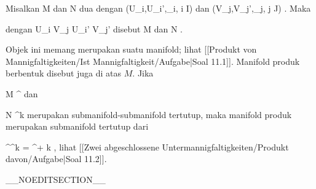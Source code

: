 \setcounter{section}{11}


{}
{

Misalkan
\mathkor {} {M} {dan} {N} {}
dua
dengan
\mathkor {} {(U_i,U_i',\alpha_i, i \in I)} {dan} {(V_j,V_j',\beta_j, j \in J)} {.}
Maka

 dengan
 {U_i \times V_j } { U_i' \times V_j'
} {}
 {} {}
disebut 
\mathkor {} {M} {dan} {N} {.}

}

Objek ini memang merupakan suatu manifold; lihat
[[Produkt von Mannigfaltigkeiten/Ist Mannigfaltigkeit/Aufgabe|Soal 11.1]].
Manifold produk berbentuk
 disebut juga  {} di atas $M$. Jika

\mavergleichskette
{\vergleichskette
{ M
}
{ \subseteq }{ \R^\ell
}
{  }{
}
{    }{
}
{   }{
}
}
{}{}{}
dan

\mavergleichskette
{\vergleichskette
{ N
}
{ \subseteq }{ \R^k
}
{  }{
}
{    }{
}
{   }{
}
}
{}{}{}
merupakan submanifold-submanifold tertutup, maka manifold produk
 merupakan submanifold tertutup dari

\mavergleichskette
{\vergleichskette
{ \R^\ell \times \R^k
}
{ = }{ \R^{\ell + k}
}
{  }{
}
{    }{
}
{   }{
}
}
{}{}{,}
lihat
[[Zwei abgeschlossene Untermannigfaltigkeiten/Produkt davon/Aufgabe|Soal 11.2]].

__NOEDITSECTION__

